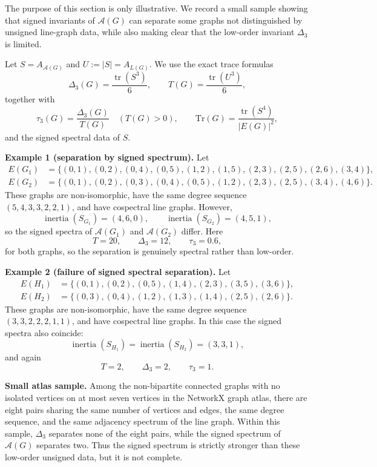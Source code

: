 \documentclass[11pt]{article}
\theoremstyle{plain}
\begin{document}
The purpose of this section is only illustrative.
We record a small sample showing that signed invariants of $\mathcal A(G)$ can
separate some graphs not distinguished by unsigned line-graph data, while also
making clear that the low-order invariant $\Delta_3$ is limited.

Let $S=A_{\mathcal A(G)}$ and $U:=|S|=A_{L(G)}$.
We use the exact trace formulas
\[
\Delta_3(G)=\frac{\operatorname{tr}(S^3)}{6},
\qquad
T(G)=\frac{\operatorname{tr}(U^3)}{6},
\]
together with
\[
\tau_3(G)=\frac{\Delta_3(G)}{T(G)}
\quad (T(G)>0),
\qquad
\mathrm{Tr}(G)=\frac{\operatorname{tr}(S^4)}{|E(G)|^2},
\]
and the signed spectral data of $S$.

\medskip
\noindent\textbf{Example 1 (separation by signed spectrum).}
Let
\[
\begin{aligned}
E(G_1)&=\{(0,1),(0,2),(0,4),(0,5),(1,2),(1,5),(2,3),(2,5),(2,6),(3,4)\},\\
E(G_2)&=\{(0,1),(0,2),(0,3),(0,4),(0,5),(1,2),(2,3),(2,5),(3,4),(4,6)\}.
\end{aligned}
\]
These graphs are non-isomorphic, have the same degree sequence
$(5,4,3,3,2,2,1)$, and have cospectral line graphs.
However,
\[
\operatorname{inertia}(S_{G_1})=(4,6,0),\qquad
\operatorname{inertia}(S_{G_2})=(4,5,1),
\]
so the signed spectra of $\mathcal A(G_1)$ and $\mathcal A(G_2)$ differ.
Here
\[
T=20,\qquad \Delta_3=12,\qquad \tau_3=0.6,
\]
for both graphs, so the separation is genuinely spectral rather than low-order.

\medskip
\noindent\textbf{Example 2 (failure of signed spectral separation).}
Let
\[
\begin{aligned}
E(H_1)&=\{(0,1),(0,2),(0,5),(1,4),(2,3),(3,5),(3,6)\},\\
E(H_2)&=\{(0,3),(0,4),(1,2),(1,3),(1,4),(2,5),(2,6)\}.
\end{aligned}
\]
These graphs are non-isomorphic, have the same degree sequence
$(3,3,2,2,2,1,1)$, and have cospectral line graphs.
In this case the signed spectra also coincide:
\[
\operatorname{inertia}(S_{H_1})=\operatorname{inertia}(S_{H_2})=(3,3,1),
\]
and again
\[
T=2,\qquad \Delta_3=2,\qquad \tau_3=1.
\]

\medskip
\noindent\textbf{Small atlas sample.}
Among the non-bipartite connected graphs with no isolated vertices on at most
seven vertices in the NetworkX graph atlas, there are eight pairs sharing the
same number of vertices and edges, the same degree sequence, and the same
adjacency spectrum of the line graph.
Within this sample, $\Delta_3$ separates none of the eight pairs, while the
signed spectrum of $\mathcal A(G)$ separates two.
Thus the signed spectrum is strictly stronger than these low-order unsigned data,
but it is not complete.
\end{document}
